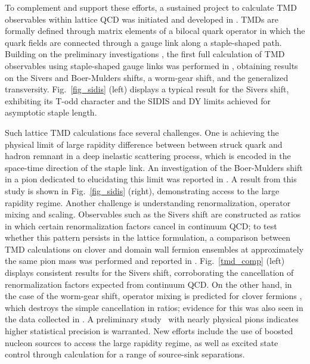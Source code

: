 To complement and support these efforts, a sustained
project to calculate TMD observables within lattice QCD was initiated
and developed in \cite{Hagler:2009mb,Musch:2010ka,Musch:2011er,Engelhardt:2015xja,Yoon:2017qzo,Engelhardt:2017miy}.
TMDs are formally defined through matrix elements of a bilocal quark
operator in which the quark fields are connected through a gauge link
along a staple-shaped path. Building on the preliminary investigations
\cite{Hagler:2009mb,Musch:2010ka}, the first full calculation of TMD
observables using staple-shaped gauge links was performed in
\cite{Musch:2011er}, obtaining results on the Sivers and Boer-Mulders
shifts, a worm-gear shift, and the generalized transversity.
Fig.~\ref{fig_sidis} (left) displays a typical result for the Sivers
shift, exhibiting its T-odd character and the SIDIS and DY limits
achieved for asymptotic staple length.

Such lattice TMD calculations face several challenges. One is achieving
the physical limit of large rapidity difference between between struck
quark and hadron remnant in a deep inelastic scattering process, which
is encoded in the space-time direction of the staple link. An investigation
of the Boer-Mulders shift in a pion dedicated to elucidating this limit
was reported in \cite{Engelhardt:2015xja}. A result from this study is
shown in Fig.~\ref{fig_sidis} (right), demonstrating access to the large
rapidity regime. Another challenge is understanding renormalization,
operator mixing and scaling. Observables such as the Sivers shift are
constructed as ratios in which certain renormalization factors cancel
in continuum QCD; to test whether this pattern persists in the lattice
formulation, a comparison between TMD calculations on clover and domain
wall fermion ensembles at approximately the same pion mass was performed
and reported in \cite{Yoon:2017qzo}. Fig.~\ref{tmd_comp} (left) displays
consistent results for the Sivers shift, corroborating the cancellation
of renormalization factors expected from continuum QCD. On the other hand,
in the case of the worm-gear shift, operator mixing is predicted for
clover fermions \cite{Constantinou:2017sej}, which destroys the simple
cancellation in ratios; evidence for this was also seen in the data
collected in \cite{Yoon:2017qzo}.
A preliminary study~\cite{Engelhardt:2015czw} with nearly physical
pions indicates higher statistical precision is warranted. New efforts
include the use of boosted nucleon sources to access the large
rapidity regime, as well as excited state control through calculation
for a range of source-sink separations.

